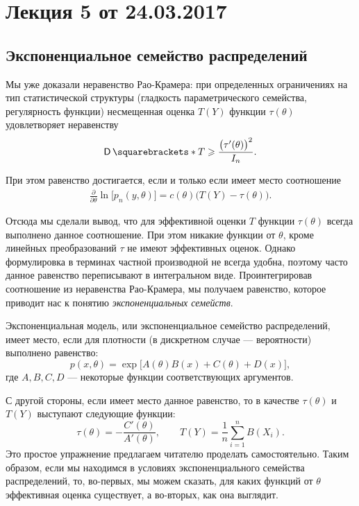 \section{Лекция 5 от 24.03.2017}
\subsection{Экспоненциальное семейство распределений}
Мы уже доказали неравенство Рао-Крамера: при определенных ограничениях на тип статистической структуры (гладкость параметрического семейства, регулярность функции) несмещенная оценка $T(Y)$ функции $\tau(\theta)$ удовлетворяет неравенству
\[
    \D{T} \geqslant \frac{\big(\tau'(\theta)\big)^2}{I_n}.
\]

При этом равенство достигается, если и только если имеет место соотношение
\begin{gather}
    \frac{\partial}{\partial{\theta}}\ln\big[p_n(y, \theta)\big] = c(\theta)\big( T(Y) - \tau(\theta)\big).
\end{gather}

Отсюда мы сделали вывод, что для эффективной оценки $T$ функции $\tau(\theta)$ всегда выполнено данное соотношение. При этом никакие функции от $\theta$, кроме линейных преобразований $\tau$ не имеют эффективных оценок. Однако формулировка в терминах частной производной не всегда удобна, поэтому часто данное равенство переписывают в интегральном виде. Проинтегрировав соотношение из неравенства Рао-Крамера, мы получаем равенство, которое приводит нас к понятию \emph{экспоненциальных семейств}.

\begin{definition}
    Экспоненциальная модель, или экспоненциальное семейство распределений, имеет место, если для плотности (в дискретном случае --- вероятности) выполнено равенство:
    \[
        p(x, \theta) = \exp\Big[A(\theta)B(x) + C(\theta) + D(x)\Big],
    \]
    где $A, B, C, D$ --- некоторые функции соответствующих аргументов.
\end{definition}

С другой стороны, если имеет место данное равенство, то в качестве $\tau(\theta)$ и $T(Y)$ выступают следующие функции:
\[
    \tau(\theta) = -\frac{C'(\theta)}{A'(\theta)}, \qquad T(Y) = \frac1n \sum\limits_{i=1}^n B(X_i).
\]
Это простое упражнение предлагаем читателю проделать самостоятельно. Таким образом, если мы находимся в условиях экспоненциального семейства распределений, то, во-первых, мы можем сказать, для каких функций от $\theta$ эффективная оценка существует, а во-вторых, как она выглядит.

